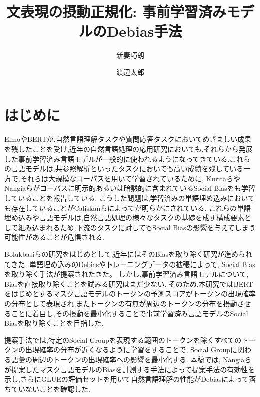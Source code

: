 \documentclass[
  platex, dvipdfmx %
]{nlp2021}
\title{文表現の摂動正規化: 事前学習済みモデルのDebias手法}
\author{新妻巧朗}
\author{渡辺太郎}
\affil{奈良先端科学技術大学院大学 先端科学技術研究科 \\ \texttt{\{niitsuma.takuro.nm3, taro\}@is.naist.jp}}
\begin{document}
\maketitle

\section{はじめに}
ElmoやBERTが,自然言語理解タスクや質問応答タスクにおいてめざましい成果を残した\cite{Peters:2018, devlin2018bert}ことを受け,近年の自然言語処理の応用研究においても,それらから発展した事前学習済み言語モデルが一般的に使われるようになってきている.これらの言語モデルは,共参照解析\cite{joshi2019spanbert}といったタスクにおいても高い成績を残している一方で,それらは大規模なコーパスを用いて学習されているために, Kuritaら\cite{kurita2019measuring}やNangiaら\cite{nangia2020crows}がコーパスに明示的あるいは暗黙的に含まれているSocial Biasをも学習していることを報告している.
こうした問題は,学習済みの単語埋め込みにおいても存在していることがCaliskanら\cite{caliskan2017}によってが明らかにされている.
これらの単語埋め込みや言語モデルは,自然言語処理の様々なタスクの基礎を成す構成要素として組み込まれるため,下流のタスクに対してもSocial Biasの影響を与えてしまう可能性があることが危惧される.

Bolukbasiら\cite{bolukbasi2016man}の研究をはじめとして,近年にはそのBiasを取り除く研究が進められてきた.
単語埋め込みのDebiasやトレーニングデータの拡張によって, Social Biasを取り除く手法\cite{kaneko-bollegala-2019-gender, zhao-etal-2018-gender, lucas2018}が提案されたきた。
しかし,事前学習済み言語モデルについて, Biasを直接取り除くことを試みる研究はまだ少ない.
そのため,本研究ではBERTをはじめとするマスク言語モデルのトークンの予測スコアがトークンの出現確率の分布として表現され,またトークンの有無が周辺のトークンの分布を摂動させることに着目し,その摂動を最小化することで事前学習済み言語モデルのSocial Biasを取り除くことを目指した.

提案手法では,特定のSocial Groupを表現する範囲のトークンを除くすべてのトークンの出現確率の分布が近くなるように学習をすることで, Social Groupに関わる語彙の周辺のトークンの出現確率への影響を最小化する.
本稿では, Nangiaら\cite{nangia2020crows}が提案したマスク言語モデルのBiasを計測する手法によって提案手法の有効性を示し,さらにGLUEの評価セットを用いて自然言語理解の性能がDebiasによって落ちていないことを確認した.
\end{document}
